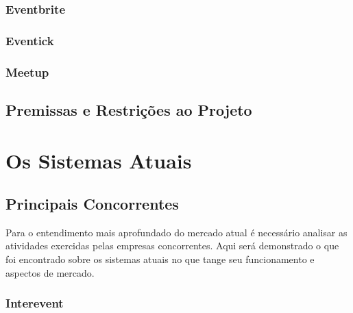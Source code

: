 \documentclass[a4paper]{abntex2}
\begin{document}
\subsection*{Eventbrite}

\subsection*{Eventick}

\subsection*{Meetup}


\section{Premissas e Restrições ao Projeto}

\chapter{Os Sistemas Atuais}

\section{Principais Concorrentes}
Para o entendimento mais aprofundado do mercado atual é necessário analisar as atividades exercidas pelas empresas concorrentes. Aqui será demonstrado o que foi encontrado sobre os sistemas atuais no que tange seu funcionamento e aspectos de mercado.

\subsection{Interevent}
\end{document}
